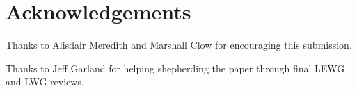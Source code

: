 \section{Acknowledgements}

Thanks to Alisdair Meredith and Marshall Clow for encouraging this submission.

Thanks to Jeff Garland for helping shepherding the paper through final LEWG and LWG reviews.
